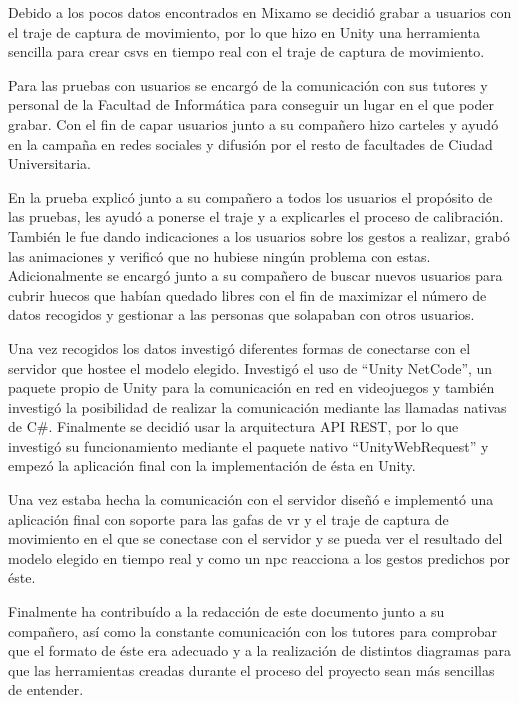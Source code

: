 Debido a los pocos datos encontrados en Mixamo se decidió grabar a usuarios con el traje de captura de movimiento, por lo que hizo en Unity una herramienta sencilla para crear \glspl{csv} en tiempo real con el traje de captura de movimiento.

Para las pruebas con usuarios se encargó de la comunicación con sus tutores y personal de la Facultad de Informática para conseguir un lugar en el que poder grabar.
Con el fin de capar usuarios junto a su compañero hizo carteles y ayudó en la campaña en redes sociales y difusión por el resto de facultades de Ciudad Universitaria.

En la prueba explicó junto a su compañero a todos los usuarios el propósito de las pruebas, les ayudó a ponerse el traje y a explicarles el proceso de calibración.
También le fue dando indicaciones a los usuarios sobre los gestos a realizar, grabó las animaciones y verificó que no hubiese ningún problema con estas.
Adicionalmente se encargó junto a su compañero de buscar nuevos usuarios para cubrir huecos que habían quedado libres con el fin de maximizar el número de datos recogidos y gestionar a las personas que solapaban con otros usuarios.

Una vez recogidos los datos investigó diferentes formas de conectarse con el servidor que hostee el modelo elegido.
Investigó el uso de ``Unity NetCode'', un paquete propio de Unity para la comunicación en red en videojuegos y también investigó la posibilidad de realizar la comunicación mediante las llamadas nativas de C\#.
Finalmente se decidió usar la arquitectura \gls{API REST}, por lo que investigó su funcionamiento mediante el paquete nativo ``UnityWebRequest'' y empezó la aplicación final con la implementación de ésta en Unity.

Una vez estaba hecha la comunicación con el servidor diseñó e implementó una aplicación final con soporte para las gafas de \gls{vr} y el traje de captura de movimiento en el que se conectase con el servidor y se pueda ver el resultado del modelo elegido en tiempo real y como un \gls{npc} reacciona a los gestos predichos por éste.

Finalmente ha contribuído a la redacción de este documento junto a su compañero, así como la constante comunicación con los tutores para comprobar que el formato de éste era adecuado y a la realización de distintos diagramas para que las herramientas creadas durante el proceso del proyecto sean más sencillas de entender.